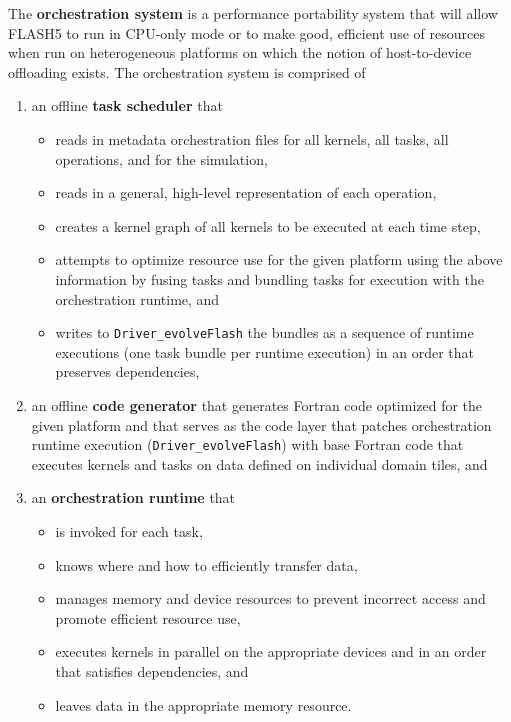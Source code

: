 \documentclass{article}
\begin{document}
The \textbf{orchestration system} is a performance portability system that will
allow FLASH5 to run in CPU-only mode or to make good, efficient use of resources
when run on heterogeneous platforms on which the notion of host-to-device
offloading exists. The orchestration system is comprised of
\begin{enumerate}
\item{an offline \textbf{task scheduler} that}
    \begin{itemize}
    \item{reads in metadata orchestration files for all kernels, all tasks, all
    operations, and for the simulation,}
    \item{reads in a general, high-level representation of each operation,}
    \item{creates a kernel graph of all kernels to be executed at each time step,}
    \item{attempts to optimize resource use for the given platform using the
    above information by fusing tasks and bundling tasks for execution with the
    orchestration runtime, and}
    \item{writes to \texttt{Driver\_evolveFlash} the bundles as a sequence of runtime executions (one task
    bundle per runtime execution) in an order that preserves dependencies,}
    \end{itemize}
\item{an offline \textbf{code generator} that generates Fortran code optimized
for the given platform and that serves as the code layer that patches
orchestration runtime execution (\texttt{Driver\_evolveFlash}) with base Fortran
code that executes kernels and tasks on data defined on individual domain tiles,
and}
\item{an \textbf{orchestration runtime} that}
    \begin{itemize}
    \item{is invoked for each task,}
    \item{knows where and how to efficiently transfer data,}
    \item{manages memory and device resources to prevent incorrect access and
    promote efficient resource use,}
    \item{executes kernels in parallel on the appropriate devices and in an
    order that satisfies dependencies, and}
    \item{leaves data in the appropriate memory resource.}
    \end{itemize}
\end{enumerate}
\end{document}

